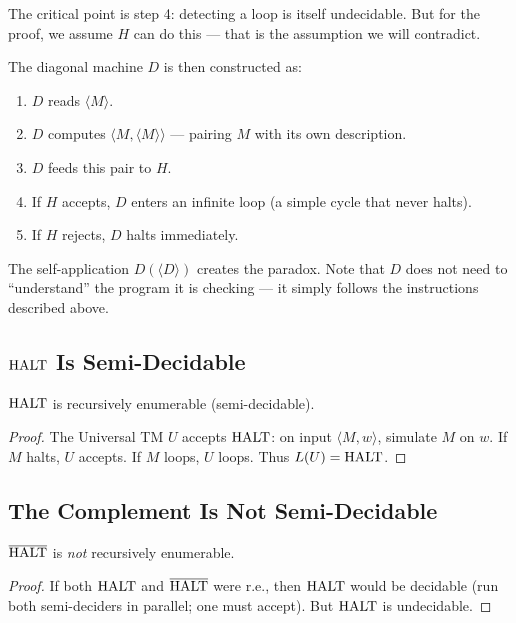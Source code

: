 The critical point is step 4: detecting a loop is itself undecidable. But for the proof, we assume $H$ can do this — that is the assumption we will contradict.

The diagonal machine $D$ is then constructed as:
\begin{enumerate}
\item $D$ reads $\langle M \rangle$.
\item $D$ computes $\langle M, \langle M \rangle \rangle$ — pairing $M$ with its own description.
\item $D$ feeds this pair to $H$.
\item If $H$ accepts, $D$ enters an infinite loop (a simple cycle that never halts).
\item If $H$ rejects, $D$ halts immediately.
\end{enumerate}

The self-application $D(\langle D \rangle)$ creates the paradox. Note that $D$ does not need to ``understand'' the program it is checking — it simply follows the instructions described above.

\subsection{\texorpdfstring{$\text{HALT}$}{HALT} Is Semi-Decidable}
\label{sec:halting:semidecidable}

\begin{theorem}
$\text{HALT}$ is recursively enumerable (semi-decidable).
\end{theorem}

\begin{proof}
The Universal TM $U$ accepts $\text{HALT}$: on input $\langle M, w \rangle$, simulate $M$ on $w$. If $M$ halts, $U$ accepts. If $M$ loops, $U$ loops. Thus $L(U) = \text{HALT}$.
\end{proof}

\subsection{The Complement Is Not Semi-Decidable}
\label{sec:halting:complement}

\begin{theorem}
$\overline{\text{HALT}}$ is \emph{not} recursively enumerable.
\end{theorem}

\begin{proof}
If both $\text{HALT}$ and $\overline{\text{HALT}}$ were r.e., then $\text{HALT}$ would be decidable (run both semi-deciders in parallel; one must accept). But $\text{HALT}$ is undecidable.
\end{proof}

